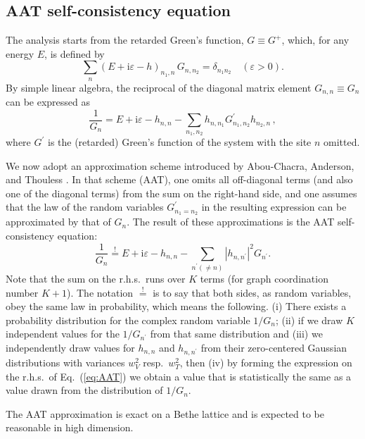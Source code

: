 \documentclass[aps,prl,twocolumn,letterpaper,superscriptaddress]{revtex4-2}
\begin{document}
\subsection{AAT self-consistency equation}
The analysis starts from the retarded Green's function, $G \equiv G^+$, which, for any energy $E$, is defined by
\begin{equation}
    \sum_n (E + \mathrm{i} \varepsilon - h)_{n_1 , n} \, {G}_{n , n_2} = \delta_{n_1 n_2}  \quad (\varepsilon > 0) .
\end{equation}
By simple linear algebra, the reciprocal of the diagonal matrix element ${G}_{n,n} \equiv {G}_n$ can be expressed as
\begin{equation}
    \frac{1}{{G}_n} = E + \mathrm{i}\varepsilon - h_{n,n} - \sum_{n_1 , n_2} h_{n, n_1} {G}_{n_1 , n_2}^\prime h_{n_2 , n} \,,
\end{equation}
where ${G}^\prime$ is the (retarded) Green's function of the system with the site $n$ omitted.

We now adopt an approximation scheme introduced by Abou-Chacra, Anderson, and Thouless \cite{AAT1973}. In that scheme (AAT), one omits all off-diagonal terms (and also one of the diagonal terms) from the sum on the right-hand side, and one assumes that the law of the random variables ${G}_{n_1 = n_2}^\prime$ in the resulting expression can be approximated by that of ${G}_n$. The result of these approximations is the AAT self-consistency equation:
\begin{equation}\label{eq:AAT}
    \frac{1}{{G}_n}\stackrel{!}{=} E + \mathrm{i}\varepsilon - h_{n,n} - \sum_{n^\prime (\not= n)} |h_{n, n^\prime}|^2 {G}_{n^\prime}.
\end{equation}
Note that the sum on the r.h.s.\ runs over $K$ terms (for graph coordination number $K+1$). The notation $\stackrel{!}{=}$ is to say that both sides, as random variables, obey the same law in probability, which means the following. (i) There exists a probability distribution for the complex random variable $1/ G_n$; (ii) if we draw $K$ independent values for the $1/{G}_{n^\prime}$ from that same distribution and (iii) we independently draw values for $h_{n,n}$ and $h_{n,n^\prime}$ from their zero-centered Gaussian distributions with variances $w_V^2$ resp.\ $w_T^2$, then (iv) by forming the expression on the r.h.s.\ of Eq.\ (\ref{eq:AAT}) we obtain a value that is statistically the same as a value drawn from the distribution of $1/G_n$.

The AAT approximation is exact on a Bethe lattice and is expected to be reasonable in high dimension.
\end{document}
